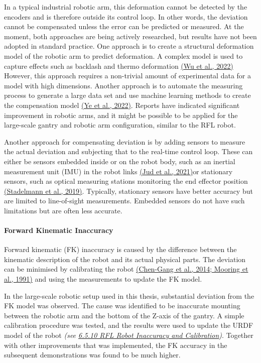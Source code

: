 \documentclass[11pt]{book}
\begin{document}
In a typical industrial robotic arm, this deformation cannot be detected by the encoders and is therefore outside its control loop. In other words, the deviation cannot be compensated unless the error can be predicted or measured. At the moment, both approaches are being actively researched, but results have not been adopted in standard practice. One approach is to create a structural deformation model of the robotic arm to predict deformation. A complex model is used to capture effects such as backlash and thermo deformation \href{https://www.zotero.org/google-docs/?Nv5Zzb}{(Wu et al., 2022)} However, this approach requires a non-trivial amount of experimental data for a model with high dimensions. Another approach is to automate the measuring process to generate a large data set and use machine learning methods to create the compensation model \href{https://www.zotero.org/google-docs/?ok9LVb}{(Ye et al., 2022)}. Reports have indicated significant improvement in robotic arms, and it might be possible to be applied for the large-scale gantry and robotic arm configuration, similar to the RFL robot.

Another approach for compensating deviation is by adding sensors to measure the actual deviation and subjecting that to the real-time control loop. These can either be sensors embedded inside or on the robot body, such as an inertial measurement unit (IMU) in the robot links \href{https://www.zotero.org/google-docs/?ad8d1c}{(Jud et al., 2021)}or stationary sensors, such as optical measuring stations monitoring the end effector position \href{https://www.zotero.org/google-docs/?92Sxfe}{(Stadelmann et al., 2019)}. Typically, stationary sensors have better accuracy but are limited to line-of-sight measurements. Embedded sensors do not have such limitations but are often less accurate. 

\paragraph{Forward Kinematic Inaccuracy}

Forward kinematic (FK) inaccuracy is caused by the difference between the kinematic description of the robot and its actual physical parts. The deviation can be minimised by calibrating the robot \href{https://www.zotero.org/google-docs/?IzoUq3}{(Chen-Gang et al., 2014; Mooring et al., 1991)} and using the measurements to update the FK model.

In the large-scale robotic setup used in this thesis, substantial deviation from the FK model was observed. The cause was identified to be inaccurate mounting between the robotic arm and the bottom of the Z-axis of the gantry. A simple calibration procedure was tested, and the results were used to update the URDF model of the robot \textit{(see \uline{6.5.10 RFL Robot Inaccuracy and Calibration})}. Together with other improvements that was implemented, the FK accuracy in the subsequent demonstrations was found to be much higher.
\end{document}
